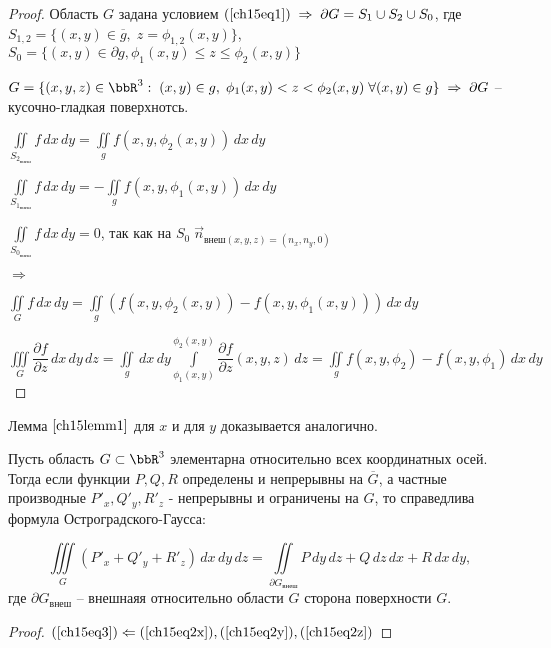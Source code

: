 \begin{proof}
Область $G$ задана условием $(\ref{ch15eq1}) \; \Rightarrow \; \partial G = S_1 \cup S_2 \cup S_0$, 
где $S_{1,2} = \{ (x,y) \in \overline{g}, \; z = \phi_{1,2}(x,y) \}$, $S_0 = \{ (x,y) \in \partial g, \phi_1(x,y) \le z \le \phi_2(x,y) \}$ 

$G = \{ (x,y,z) \in \bbR^3: \; (x,y) \in g, \; \phi_1(x,y) < z < \phi_2(x,y) \; \forall (x,y) \in g \} \; \Rightarrow \; \partial G$ -- кусочно-гладкая поверхнотсь.

$\displaystyle\iint\limits_{S_{2_{\textit{внеш}}}} f \,dx\,dy = \displaystyle\iint\limits_g f(x,y,\phi_2(x,y)) \,dx\,dy$

$\displaystyle\iint\limits_{S_{1_{\textit{внеш}}}} f \,dx\,dy = - \displaystyle\iint\limits_g f(x,y,\phi_1(x,y)) \,dx\,dy$

$\displaystyle\iint\limits_{S_{0_{\textit{внеш}}}} f \,dx\,dy = 0$, так как на $S_0 \; \overset{\to}{n}_{\textit{внеш}(x,y,z) = (n_x, n_y, 0)}$

$\Rightarrow$

$\displaystyle\iint\limits_G f \,dx\,dy = \displaystyle\iint\limits_g (f(x,y,\phi_2(x,y)) - f(x,y,\phi_1(x,y))) \,dx \,dy$

$\displaystyle\iiint\limits_G \dfrac{\partial f}{\partial z} \,dx \,dy \,dz = \displaystyle\iint\limits_g \,dx \,dy \displaystyle\int\limits_{\phi_1(x,y)}^{\phi_2(x,y)} \dfrac{\partial f}{\partial z}(x,y,z) \,dz = \displaystyle\iint\limits_g f(x,y,\phi_2) - f(x,y,\phi_1) \,dx \,dy$

\end{proof}

\begin{cons}
Лемма $\ref{ch15lemm1}$ для $x$ и для $y$ доказывается аналогично.
\end{cons}

\begin{thm} 
Пусть область $G \subset \bbR^3$ элементарна относительно всех координатных осей. Тогда если функции $P,Q,R$ определены и непрерывны на $\overline{G}$, а частные производные $P'_x, Q'_y, R'_z$ - непрерывны и ограничены на $G$, то справедлива формула Остроградского-Гаусса:

\begin{equation} \label{ch15eq3}
\iiint\limits_G (P'_x + Q'_y + R'_z) \,dx\,dy\,dz = \iint\limits_{\partial G_{\textit{внеш}}} P\,dy\,dz + Q\,dz\,dx + R\,dx\,dy,
\end{equation}
где $\partial G_{\textit{внеш}}$ -- внешнаяя относительно области $G$ сторона поверхности $G$.

\end{thm}
\begin{proof}
$(\ref{ch15eq3}) \Leftarrow (\ref{ch15eq2x}), (\ref{ch15eq2y}), (\ref{ch15eq2z})$
\end{proof}

